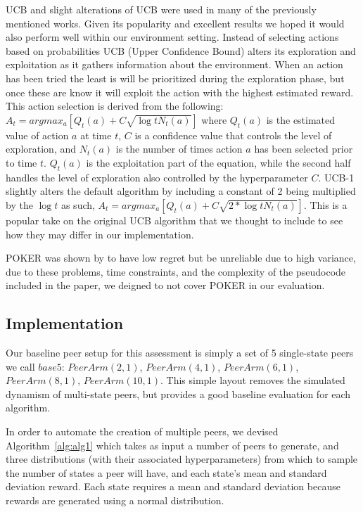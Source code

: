 \documentclass{article}
\begin{document}
UCB and slight alterations of UCB were used in many of the previously mentioned works. Given its popularity and excellent results we hoped it would also perform well within 
our environment setting. Instead of selecting actions based on probabilities UCB (Upper Confidence Bound) alters its exploration and exploitation as it gathers information 
about the environment. When an action has been tried the least is will be prioritized during the exploration phase, but once these are know it will exploit the 
action with the highest estimated reward. This action selection is derived from the following: $A_t = argmax_a \left[Q_t(a) + C \sqrt{\log{t} N_t(a)}\right]$ where 
$Q_t(a)$ is the estimated value of action $a$ at time $t$, $C$ is a confidence value that controls the level of exploration, and $N_t(a)$ is the number of times 
action $a$ has been selected prior to time $t$. $Q_t(a)$ is the exploitation part of the equation, while the second half handles the level of exploration also controlled by
the hyperparameter $C$. UCB-1 slightly alters the default algorithm by including a constant of 2 being multiplied by the $\log{t}$ as such, $A_t = argmax_a 
\left[Q_t(a) + C \sqrt{2*\log{t} N_t(a)}\right]$. This is a popular take on the original UCB algorithm that we thought to include to see how they may differ in our 
implementation. 

POKER was shown by \cite{muMAB_wireless} to have low regret but be unreliable due to high variance, due to these problems, time constraints, and the complexity of the 
pseudocode included in the paper, we deigned to not cover POKER in our evaluation.


\subsection{Implementation}
Our baseline peer setup for this assessment is simply a set of 5 single-state peers we call $base5$: $PeerArm(2,1)$, $PeerArm(4,1)$, $PeerArm(6,1)$, $PeerArm(8,1)$, 
$PeerArm(10,1)$. This simple layout removes the simulated dynamism of multi-state peers, but provides a good baseline evaluation for each algorithm. 

In order to automate the creation of multiple peers, we devised Algorithm~\ref{alg:alg1} which takes as input a number of peers to generate, and three distributions (with 
their associated hyperparameters) from which to sample the number of states a peer will have, and each state's mean and standard deviation reward. Each state requires a 
mean and standard deviation because rewards are generated using a normal distribution. 
\end{document}
